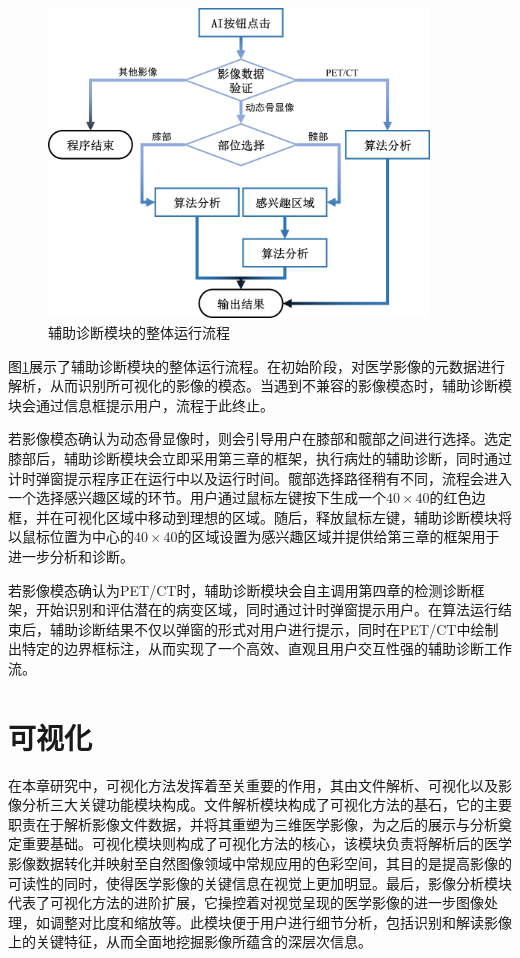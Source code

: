 \begin{figure}[htbp]
  \centering
  \includegraphics[width=0.9\textwidth]{figures/chap05_diagnose.jpg}
  \caption{辅助诊断模块的整体运行流程}
  \label{fig:chap05_diagnose}
\end{figure}

图\ref{fig:chap05_diagnose}展示了辅助诊断模块的整体运行流程。在初始阶段，对医学影像的元数据进行解析，从而识别所可视化的影像的模态。当遇到不兼容的影像模态时，辅助诊断模块会通过信息框提示用户，流程于此终止。

若影像模态确认为动态骨显像时，则会引导用户在膝部和髋部之间进行选择。选定膝部后，辅助诊断模块会立即采用第三章的框架，执行病灶的辅助诊断，同时通过计时弹窗提示程序正在运行中以及运行时间。髋部选择路径稍有不同，流程会进入一个选择感兴趣区域的环节。用户通过鼠标左键按下生成一个\(40 \times 40\)的红色边框，并在可视化区域中移动到理想的区域。随后，释放鼠标左键，辅助诊断模块将以鼠标位置为中心的\(40 \times40 \)的区域设置为感兴趣区域并提供给第三章的框架用于进一步分析和诊断。

若影像模态确认为PET/CT时，辅助诊断模块会自主调用第四章的检测诊断框架，开始识别和评估潜在的病变区域，同时通过计时弹窗提示用户。在算法运行结束后，辅助诊断结果不仅以弹窗的形式对用户进行提示，同时在PET/CT中绘制出特定的边界框标注，从而实现了一个高效、直观且用户交互性强的辅助诊断工作流。

\section{可视化}

在本章研究中，可视化方法发挥着至关重要的作用，其由文件解析、可视化以及影像分析三大关键功能模块构成。文件解析模块构成了可视化方法的基石，它的主要职责在于解析影像文件数据，并将其重塑为三维医学影像，为之后的展示与分析奠定重要基础。可视化模块则构成了可视化方法的核心，该模块负责将解析后的医学影像数据转化并映射至自然图像领域中常规应用的色彩空间，其目的是提高影像的可读性的同时，使得医学影像的关键信息在视觉上更加明显。最后，影像分析模块代表了可视化方法的进阶扩展，它操控着对视觉呈现的医学影像的进一步图像处理，如调整对比度和缩放等。此模块便于用户进行细节分析，包括识别和解读影像上的关键特征，从而全面地挖掘影像所蕴含的深层次信息。

